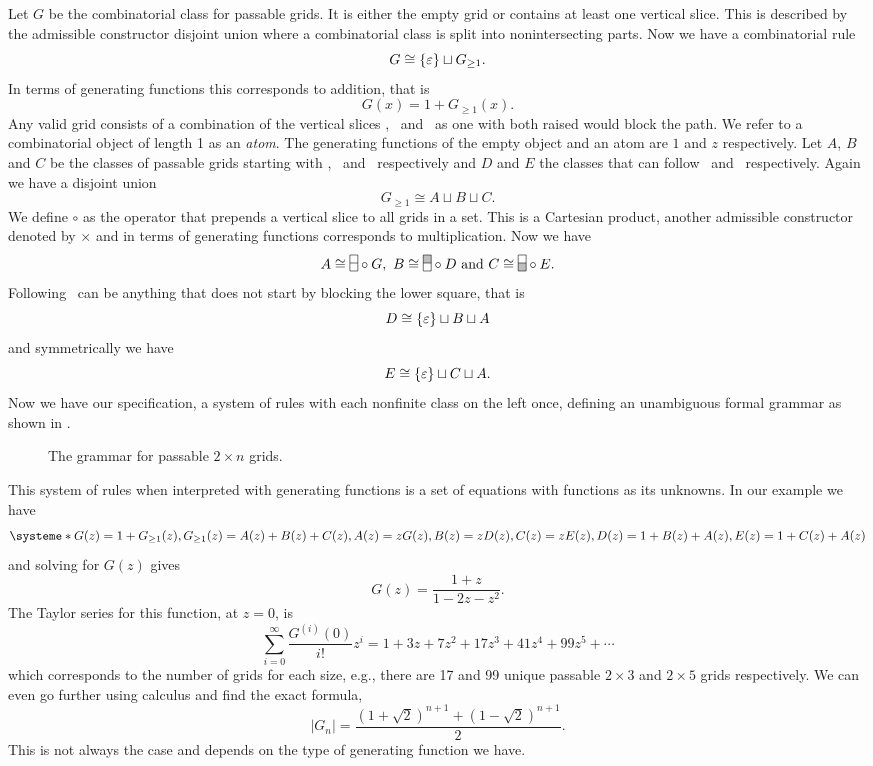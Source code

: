 Let $G$ be the combinatorial class for passable grids. It is either the empty grid or contains at least one vertical slice. This is described by the admissible constructor disjoint union where a combinatorial class is split into nonintersecting parts. Now we have a combinatorial rule 
\[
    G \cong \left\{\varepsilon\right\} \sqcup G_{\geq 1}.
\]
In terms of generating functions this corresponds to addition, that is 
\[
    G(x) = 1 + G_{\geq1}(x).
\] 
Any valid grid consists of a combination of the vertical slices \gridN, \gridU\ and \gridD\ as one with both raised would block the path. We refer to a combinatorial object of length 1 as an \emph{atom}. The generating functions of the empty object and an atom are $1$ and $z$ respectively. Let $A$, $B$ and $C$ be the classes of passable grids starting with \gridN, \gridU\ and \gridD\ respectively and $D$ and $E$ the classes that can follow \gridU\ and \gridD\ respectively. Again we have a disjoint union 
\[
    G_{\geq1} \cong A \sqcup B \sqcup C.
\]
We define $\circ$ as the operator that prepends a vertical slice to all grids in a set. This is a Cartesian product, another admissible constructor denoted by $\times$ and in terms of generating functions corresponds to multiplication. Now we have 
\[
    A \cong \gridN \circ G, \ B \cong \gridU \circ D \text{ and } C \cong \gridD \circ E.
\]
Following \gridU\ can be anything that does not start by blocking the lower square, that is 
\[
    D \cong \left\{\varepsilon\right\} \sqcup B \sqcup A
\]
and symmetrically we have 
\[
    E \cong \left\{\varepsilon\right\} \sqcup C \sqcup A.
\]
Now we have our specification, a system of rules with each nonfinite class on the left once, defining an unambiguous formal grammar as shown in .

\begin{figure}[ht!]
    \centering
    
    \caption{The grammar for passable $2\times n$ grids.}
    \label{fig:gridtree}
\end{figure}

This system of rules when interpreted with generating functions is a set of equations with functions as its unknowns. In our example we have
\[
    \systeme*{G(z) = 1 + G_{\geq1}(z), G_{\geq1}(z) = A(z) + B(z) + C(z),A(z) = zG(z), B(z) = zD(z), C(z) = zE(z), D(z) = 1+B(z)+A(z), E(z) = 1+C(z)+A(z)}
\]
and solving for $G(z)$ gives 
\[
    G(z) = \frac{1+z}{1-2z-z^2}.
\]
The Taylor series for this function, at $z=0$, is
\[
    \sum_{i=0}^\infty \frac{G^{(i)}(0)}{i!}z^i = 1+3z+7z^2+17z^3+ 41z^4 + 99z^5 + \dotsm
\]
which corresponds to the number of grids for each size, e.g., there are 17 and 99 unique passable $2\times3$ and $2\times5$ grids respectively. We can even go further using calculus and find the exact formula, 
\[
|G_n| = \frac{\left(1+\sqrt{2}\right)^{n+1} + \left(1-\sqrt{2}\right)^{n+1}}{2}.
\]
This is not always the case and depends on the type of generating function we have.


